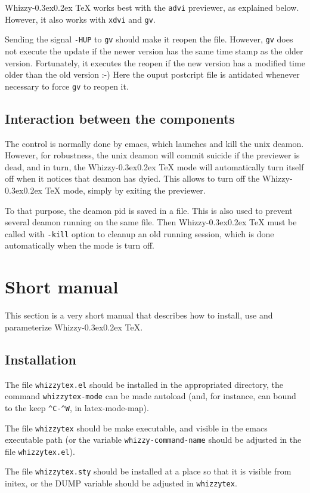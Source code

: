 \documentclass{article}
\let \lst \verb
\def \whizzy{{Whizzy\kern -0.3ex\raise 0.2ex \hbox{\TeX}}}
\begin{document}
{\whizzy} works best with the \lst"advi" previewer, as explained below. 
However, it also works with \lst"xdvi" and \lst"gv". 

Sending the signal \lst"-HUP" to \lst"gv" should make it reopen the file.
However, \lst"gv" does not execute the update if the newer version has the
same time stamp as the older version. Fortunately, it executes the reopen if
the new version has a modified time older than the old version :-) Here the
ouput postcript file  is antidated whenever necessary to force \lst"gv"
to reopen it.


\subsection {Interaction between the components} 

The control is normally done by emacs, which launches and kill the unix
deamon. However, for robustness, the unix deamon will commit suicide if the
previewer is dead, and in turn, the {\whizzy} mode will automatically turn
itself off when it notices that deamon has dyied. This allows to turn off
the {\whizzy} mode, simply by exiting the previewer.

To that purpose, the deamon pid is saved in a file. 
This is also used to prevent several deamon running on the same file. 
Then {\whizzy} must be called with \lst"-kill" option to cleanup an  old
running session, which is done automatically when the mode is turn off.


\section {Short manual} 
This section is a very short manual that describes how to install, use and
parameterize {\whizzy}. 

\subsection {Installation}

The file \lst"whizzytex.el" should be installed in the appropriated directory, 
the command \lst"whizzytex-mode" can be made autoload (and, for instance, can
bound to the keep \lst"^C-^W", in latex-mode-map). 

The file \lst"whizzytex" should be make executable, and visible in the emacs
executable path (or the variable \lst"whizzy-command-name" should be
adjusted in the file \lst"whizzytex.el"). 

The file \lst"whizzytex.sty" should be installed at a place so that it is
visible  from initex, or the DUMP variable should be adjusted in
\lst"whizzytex".  
\end{document}
